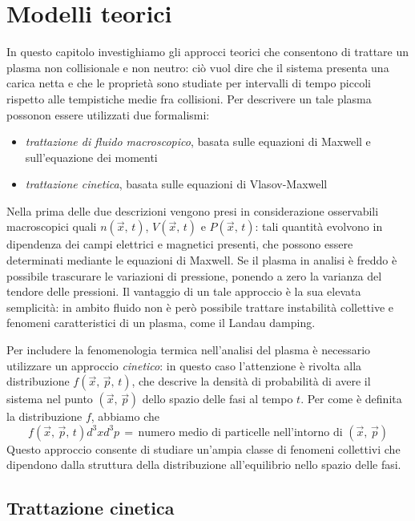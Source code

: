 \chapter{Modelli teorici}

In questo capitolo investighiamo gli approcci teorici che consentono di trattare un plasma non collisionale e non neutro: ciò
vuol dire che il sistema presenta una carica netta e che le proprietà sono studiate per intervalli di tempo piccoli rispetto
alle tempistiche medie fra collisioni. Per descrivere un tale plasma possonon essere utilizzati due formalismi:
\begin{itemize}
    \item \textit{trattazione di fluido macroscopico}, basata sulle equazioni di Maxwell e sull'equazione dei momenti
    \item \textit{trattazione cinetica}, basata sulle equazioni di Vlasov-Maxwell
\end{itemize}
Nella prima delle due descrizioni vengono presi in considerazione osservabili macroscopici quali $n\left(\vec{x},\,t\right)$, 
$V\left(\vec{x},\,t\right)$ e $P\left(\vec{x},\,t\right)$: tali quantità evolvono in dipendenza dei campi elettrici e magnetici
presenti, che possono essere determinati mediante le equazioni di Maxwell. Se il plasma in analisi è freddo è possibile trascurare
le variazioni di pressione, ponendo a zero la varianza del tendore delle pressioni. Il vantaggio di un tale approccio è la sua 
elevata semplicità: in ambito fluido non è però possibile trattare instabilità collettive e fenomeni caratteristici di un plasma, 
come il Landau damping.

Per includere la fenomenologia termica nell'analisi del plasma è necessario utilizzare un approccio \textit{cinetico}: in questo
caso l'attenzione è rivolta alla distribuzione $f\left(\vec{x},\,\vec{p},\,t\right)$, che descrive la densità di probabilità di 
avere il sistema nel punto $\left(\vec{x},\,\vec{p}\right)$ dello spazio delle fasi al tempo $t$. Per come è definita la
distribuzione $f$, abbiamo che
$$f\left(\vec{x},\,\vec{p},\,t\right)d^3xd^3p\,=\,\text{numero medio di particelle nell'intorno di } \left(\vec{x},\,\vec{p}\right)$$
Questo approccio consente di studiare un'ampia classe di fenomeni collettivi che dipendono dalla struttura della distribuzione
all'equilibrio nello spazio delle fasi.

\section{Trattazione cinetica}

